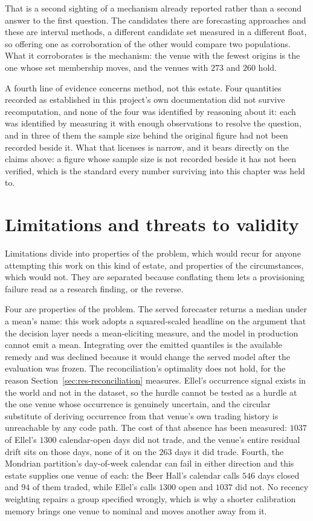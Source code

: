 That is a second sighting of a mechanism already reported rather than a second answer to the
first question. The candidates there are forecasting approaches and these are interval methods, a
different candidate set measured in a different float, so offering one as corroboration of the
other would compare two populations. What it corroborates is the mechanism: the venue with the
fewest origins is the one whose set membership moves, and the venues with $273$ and $260$ hold.

A fourth line of evidence concerns method, not this estate. Four quantities recorded
as established in this project's own documentation did not survive recomputation, and none of the
four was identified by reasoning about it: each was identified by measuring it with enough
observations to resolve the question, and in three of them the sample size behind the original
figure had not been recorded beside it. What that licenses is narrow, and it bears directly on
the claims above: a figure whose sample size is not recorded beside it has not been verified,
which is the standard every number surviving into this chapter was held to.

\section{Limitations and threats to validity}
\label{sec:disc-limitations}

Limitations divide into properties of the problem, which would recur for anyone attempting this
work on this kind of estate, and properties of the circumstances, which would not. They are
separated because conflating them lets a provisioning failure read as a research finding, or the
reverse.

Four are properties of the problem. The served forecaster returns a median under a mean's name:
this work adopts a squared-scaled headline on the argument that the decision layer needs a
mean-eliciting measure, and the model in production cannot emit a mean. Integrating over the
emitted quantiles is the available remedy and was declined because it would change the served
model after the evaluation was frozen. The reconciliation's optimality does not hold, for the
reason Section~\ref{sec:res-reconciliation} measures. Ellel's occurrence signal exists in the world and not in
the dataset, so the hurdle cannot be tested as a hurdle at the one venue whose occurrence is
genuinely uncertain, and the circular substitute of deriving occurrence from that venue's own
trading history is unreachable by any code path. The cost of that absence has been measured:
$1037$ of Ellel's $1300$ calendar-open days did not trade, and the venue's entire residual drift
sits on those days, none of it on the $263$ days it did trade. Fourth, the
Mondrian partition's day-of-week calendar can fail in either direction and this estate supplies
one venue of each: the Beer Hall's calendar calls $546$ days closed and $94$ of them traded,
while Ellel's calls $1300$ open and $1037$ did not. No recency weighting repairs a group
specified wrongly, which is why a shorter calibration memory brings one venue to nominal and
moves another away from it.

